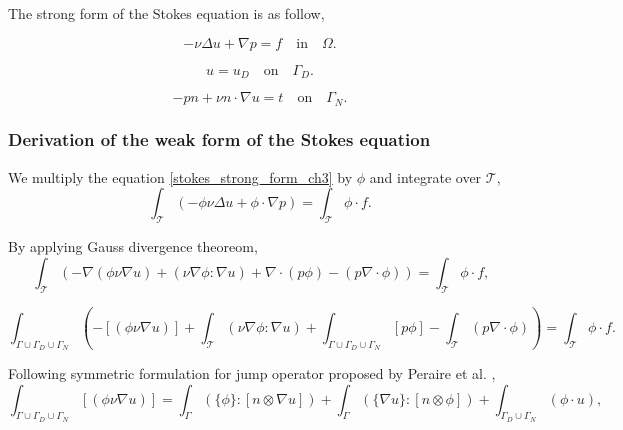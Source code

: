 \documentclass[a4paper,oneside,openright,spanish,english]{book}
\begin{document}
The strong form of the Stokes equation is as follow,

\begin{equation} \label{stokes_strong_form_ch3}
-\nu \Delta u + \nabla p = f \quad \textrm{in} \quad \Omega \textrm{.}
\end{equation}

\begin{equation} \label{dirichlet condition stokes_ch3}
u = u_D \quad \textrm{on} \quad \Gamma_D \textrm{.}
\end{equation}

\begin{equation} \label{neumann condition stokes_ch3}
-pn + \nu n \cdot \nabla u = t \quad \textrm{on} \quad \Gamma_N \textrm{.}
\end{equation}


\subsubsection{Derivation of the weak form of the Stokes equation} \label{derivation_weak_stokes}

We multiply the equation \eqref{stokes_strong_form_ch3} by $\phi$ and integrate over $\mathcal{T}$,
\begin{equation}
\int_{\mathcal{T}} (- \phi \nu \Delta u + \phi \cdot \nabla p) = \int_{\mathcal{T}} \phi \cdot f \textrm{.}
\end{equation}

By applying Gauss divergence theoreom,
\begin{equation}
\int_{\mathcal{T}} (-\nabla (\phi \nu \nabla u) + (\nu \nabla \phi : \nabla u) + \nabla \cdot (p \phi) - (p \nabla \cdot \phi)) = \int_{\mathcal{T}} \phi \cdot f \textrm{,}
\end{equation}

\begin{equation}
\int_{\Gamma \cup \Gamma_D \cup \Gamma_N} (- [(\phi \nu \nabla u)] + \int_{\mathcal{T}}  (\nu \nabla \phi : \nabla u) + \int_{\Gamma \cup \Gamma_D \cup \Gamma_N}  [p \phi] - \int_{\mathcal{T}}  (p \nabla \cdot \phi)) = \int_{\mathcal{T}} \phi \cdot f \textrm{.}
\end{equation}

Following symmetric formulation for jump operator proposed by Peraire et al. \cite{peraire},
\begin{equation}
\int_{\Gamma \cup \Gamma_D \cup \Gamma_N} [(\phi \nu \nabla u)] = \int_{\Gamma} (\lbrace \phi \rbrace : [n \otimes \nabla u]) + \int_{\Gamma} (\lbrace \nabla u \rbrace : [n \otimes \phi]) + \int_{\Gamma_D \cup \Gamma_N} (\phi \cdot u ) \textrm{,}
\end{equation}
\end{document}
